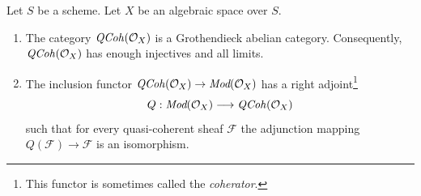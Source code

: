 \begin{proposition}
\label{proposition-coherator}
Let $S$ be a scheme. Let $X$ be an algebraic space over $S$.
\begin{enumerate}
\item The category $\mathit{QCoh}(\mathcal{O}_X)$ is a Grothendieck
abelian category. Consequently, $\mathit{QCoh}(\mathcal{O}_X)$
has enough injectives and all limits.
\item The inclusion functor
$\mathit{QCoh}(\mathcal{O}_X) \to \textit{Mod}(\mathcal{O}_X)$
has a right adjoint\footnote{This functor is sometimes called
the {\it coherator}.}
$$
Q : \textit{Mod}(\mathcal{O}_X) \longrightarrow \mathit{QCoh}(\mathcal{O}_X)
$$
such that for every quasi-coherent sheaf $\mathcal{F}$ the adjunction mapping
$Q(\mathcal{F}) \to \mathcal{F}$ is an isomorphism.
\end{enumerate}
\end{proposition}

